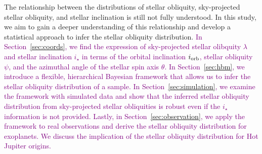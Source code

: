 \documentclass[twocolumn,times]{aastex631}
\newcommand{\edits}[1]{\textcolor{purple}{#1}}
\begin{document}
The relationship between the distributions of stellar obliquity, sky-projected stellar obliquity, and stellar inclination is still not fully understood. In this study, we aim to gain a deeper understanding of this relationship and develop a statistical approach to infer the stellar obliquity distribution.
\edits{In Section~\ref{sec:coords}, we find the expression of sky-projected stellar olibquity $\lambda$ and stellar inclination $i_\star$ in terms of the orbital inclination $i_{\rm orb}$, stellar obliquity $\psi$, and the azimuthal angle of the stellar spin axis $\theta$.
In Section~\ref{sec:hbm}, we introduce a flexible, hierarchical Bayesian framework that allows us to infer the stellar obliquity distribution of a sample.
In Section~\ref{sec:simulation}, we examine the framework with simulated data and show that the inferred stellar obliquity distribution from sky-projected stellar obliquities is robust even if the $i_\star$ information is not provided.
Lastly, in Section~\ref{sec:observation}, we apply the framework to real observations and derive the stellar obliquity distribution for exoplanets. We discuss the implication of the stellar obliquity distribution for Hot Jupiter origins.
}
\end{document}
